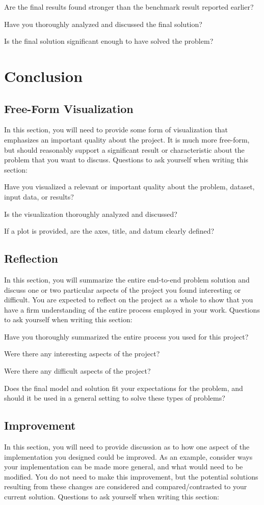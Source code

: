 \documentclass[12pt,journal,compsoc]{IEEEtran}
\begin{document}
Are the final results found stronger than the benchmark result reported earlier?

Have you thoroughly analyzed and discussed the final solution?

Is the final solution significant enough to have solved the problem?


\section{Conclusion} %
\subsection{Free-Form Visualization}
In this section, you will need to provide some form of visualization that emphasizes an important quality about the project. It is much more free-form, but should reasonably support a significant result or characteristic about the problem that you want to discuss. Questions to ask yourself when writing this section:

Have you visualized a relevant or important quality about the problem, dataset, input data, or results?

Is the visualization thoroughly analyzed and discussed?

If a plot is provided, are the axes, title, and datum clearly defined?


\subsection{Reflection}
In this section, you will summarize the entire end-to-end problem solution and discuss one or two particular aspects of the project you found interesting or difficult. You are expected to reflect on the project as a whole to show that you have a firm understanding of the entire process employed in your work. Questions to ask yourself when writing this section:

Have you thoroughly summarized the entire process you used for this project?

Were there any interesting aspects of the project?

Were there any difficult aspects of the project?

Does the final model and solution fit your expectations for the problem, and should it be used in a general setting to solve these types of problems?


\subsection{Improvement}
In this section, you will need to provide discussion as to how one aspect of the implementation you designed could be improved. As an example, consider ways your implementation can be made more general, and what would need to be modified. You do not need to make this improvement, but the potential solutions resulting from these changes are considered and compared/contrasted to your current solution. Questions to ask yourself when writing this section:
\end{document}
